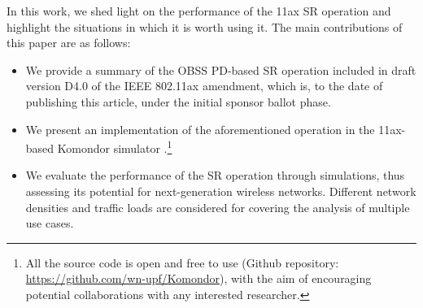 \documentclass[conference]{IEEEtran}
\begin{document}
    \begin{table}[]
    	\caption{Effect of increasing the OBSS/PD threshold and the transmission power.}
    	\label{tbl:effects_sr}
    \end{table}
	
    In this work, we shed light on the performance of the 11ax SR operation and highlight the situations in which it is worth using it. The main contributions of this paper are as follows:
	\begin{itemize}
		\item We provide a summary of the OBSS PD-based SR operation included in draft version D4.0 of the IEEE 802.11ax amendment, which is, to the date of publishing this article, under the initial sponsor ballot phase.
		\item We present an implementation of the aforementioned operation in the 11ax-based Komondor simulator \cite{komondor}.\footnote{All the source code is open and free to use (Github repository: \url{https://github.com/wn-upf/Komondor}), with the aim of encouraging potential collaborations with any interested researcher.}
		\item We evaluate the performance of the SR operation through simulations, thus assessing its potential for next-generation wireless networks. Different network densities and traffic loads are considered for covering the analysis of multiple use cases.
	\end{itemize}
	
\end{document}
